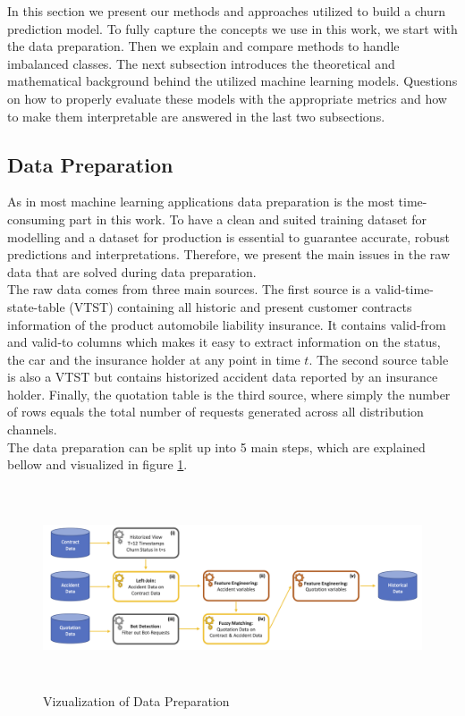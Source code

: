 \documentclass[12pt,titlepage]{article}
\begin{document}
In this section we present our methods and approaches utilized to build a churn prediction model. To fully capture the concepts we use in this work, we start with the data preparation. Then we explain and compare methods to handle imbalanced classes. The next subsection introduces the theoretical and mathematical background behind the utilized machine learning models. Questions on how to properly evaluate these models with the appropriate metrics and how to make them interpretable are answered in the last two subsections. \\

\subsection{Data Preparation} \par
\label{chap:dataprep}

As in most machine learning applications data preparation is the most time-consuming part in this work. To have a clean and suited training dataset for modelling and a dataset for production is essential to guarantee accurate, robust predictions and interpretations. Therefore, we present the main issues in the raw data that are solved during data preparation. \\
The raw data comes from three main sources. The first source is a valid-time-state-table (VTST) containing all historic and present customer contracts information of the product automobile liability insurance. It contains valid-from and valid-to columns which makes it easy to extract information on the status, the car and the insurance holder at any point in time $t$. The second source table is also a VTST but contains historized accident data reported by an insurance holder. Finally, the quotation table is the third source, where simply the number of rows equals the total number of requests generated across all distribution channels. \\
The data preparation can be split up into 5 main steps, which are explained bellow and visualized in figure \ref{fig:preparation}. \\
\begin{figure}[H]
    \centerline{\includegraphics[height=6cm]{data_preparation.png}}
\caption{Vizualization of Data Preparation}
\label{fig:preparation}
\end{figure}
\end{document}
